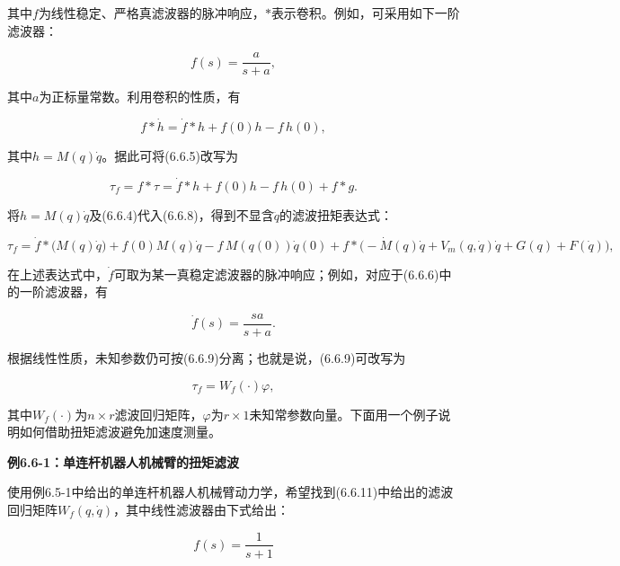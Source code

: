 \documentclass[12pt,a4paper]{ctexart}
\begin{document}
其中$f$为线性稳定、严格真滤波器的脉冲响应，$*$表示卷积。例如，可采用如下一阶滤波器：

\begin{equation}\label{eq:6.6.6}
f(s) = \frac{a}{s + a},
\end{equation}

其中$a$为正标量常数。利用卷积的性质，有

\begin{equation}\label{eq:6.6.7}
f * \dot{h} = \dot{f} * h + f(0)h - f\, h(0),
\end{equation}

其中$h = M(q)\dot{q}$。据此可将(6.6.5)改写为

\begin{equation}\label{eq:6.6.8}
\tau_f = f * \tau = \dot{f} * h + f(0)h - f\, h(0) + f * g.
\end{equation}

将$h = M(q)\dot{q}$及(6.6.4)代入(6.6.8)，得到不显含$\ddot{q}$的滤波扭矩表达式：

\begin{equation}\label{eq:6.6.9}
\tau_f = \dot{f} * \bigl(M(q)\dot{q}\bigr) + f(0)M(q)\dot{q} - f\, M(q(0))\dot{q}(0) + f * \bigl( -\dot{M}(q)\dot{q} + V_m(q, \dot{q})\dot{q} + G(q) + F(\dot{q}) \bigr),
\end{equation}

在上述表达式中，$\dot{f}$可取为某一真稳定滤波器的脉冲响应；例如，对应于(6.6.6)中的一阶滤波器，有

\begin{equation}\label{eq:6.6.10}
\dot{f}(s) = \frac{sa}{s + a}.
\end{equation}

根据线性性质，未知参数仍可按(6.6.9)分离；也就是说，(6.6.9)可改写为

\begin{equation}\label{eq:6.6.11}
\tau_f = W_f(\cdot)\varphi,
\end{equation}

其中$W_f(\cdot)$为$n \times r$滤波回归矩阵，$\varphi$为$r \times 1$未知常参数向量。下面用一个例子说明如何借助扭矩滤波避免加速度测量。

\textbf{例6.6-1：单连杆机器人机械臂的扭矩滤波}

使用例6.5-1中给出的单连杆机器人机械臂动力学，希望找到(6.6.11)中给出的滤波回归矩阵$W_f(q, \dot{q})$，其中线性滤波器由下式给出：

\begin{equation*}
f(s) = \frac{1}{s + 1}
\end{equation*}
\end{document}
